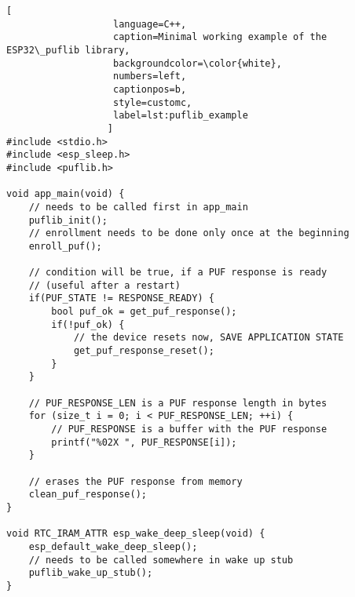 \begin{lstlisting}[
                   language=C++,
                   caption=Minimal working example of the ESP32\_puflib library,
                   backgroundcolor=\color{white},
                   numbers=left,
                   captionpos=b,
                   style=customc,
                   label=lst:puflib_example
                  ]
#include <stdio.h>
#include <esp_sleep.h>
#include <puflib.h>

void app_main(void) { 
    // needs to be called first in app_main
    puflib_init();
    // enrollment needs to be done only once at the beginning
    enroll_puf();

    // condition will be true, if a PUF response is ready
    // (useful after a restart)
    if(PUF_STATE != RESPONSE_READY) {
        bool puf_ok = get_puf_response();
        if(!puf_ok) {
            // the device resets now, SAVE APPLICATION STATE
            get_puf_response_reset();
        }
    }

    // PUF_RESPONSE_LEN is a PUF response length in bytes
    for (size_t i = 0; i < PUF_RESPONSE_LEN; ++i) {
        // PUF_RESPONSE is a buffer with the PUF response
        printf("%02X ", PUF_RESPONSE[i]);
    }

    // erases the PUF response from memory
    clean_puf_response();
}

void RTC_IRAM_ATTR esp_wake_deep_sleep(void) {
    esp_default_wake_deep_sleep();
    // needs to be called somewhere in wake up stub
    puflib_wake_up_stub();
}
\end{lstlisting}

